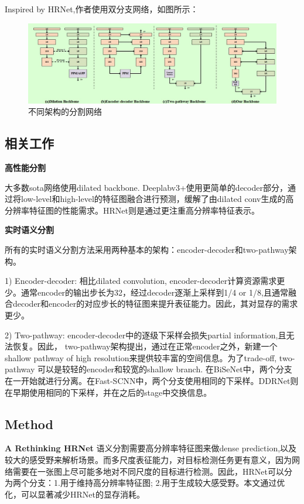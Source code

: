\documentclass{article}
\begin{document}
Inspired by HRNet,作者使用双分支网络，如图所示：
\begin{figure}[htbp]
\centering
\includegraphics[scale=0.3]{image/DDR_arch.jpg}
\caption{不同架构的分割网络}
\label{Fig.ddr_arch}
\end{figure}
\subsection{相关工作}
\textbf{高性能分割}

大多数sota网络使用dilated backbone. Deeplabv3+使用更简单的decoder部分，通过将low-level和high-level的特征图融合进行预测，缓解了由dilated conv生成的高分辨率特征图的性能需求。HRNet则是通过更注重高分辨率特征表示。

\textbf{实时语义分割}

所有的实时语义分割方法采用两种基本的架构：encoder-decoder和two-pathway架构。

1) Encoder-decoder: 相比dilated convolution, encoder-decoder计算资源需求更少。通常encoder的输出步长为32，经过decoder逐渐上采样到1/4 or 1/8,且通常融合decoder和encoder的对应步长的特征图来提升表征能力。因此，其对显存的需求更少。

2) Two-pathway: encoder-decoder中的逐级下采样会损失partial information,且无法恢复。因此， two-pathway架构提出，通过在正常encoder之外，新建一个shallow pathway of high resolution来提供较丰富的空间信息。为了trade-off, two-pathway 可以是较轻的encoder和较宽的shallow branch. 在BiSeNet中，两个分支在一开始就进行分离。在Fast-SCNN中，两个分支使用相同的下采样。DDRNet则在早期使用相同的下采样，并在之后的stage中交换信息。

\subsection{Method}
\textbf{A Rethinking HRNet}
语义分割需要高分辨率特征图来做dense prediction,以及较大的感受野来解析场景。而多尺度表征能力，对目标检测任务更有意义，因为网络需要在一张图上尽可能多地对不同尺度的目标进行检测。因此，HRNet可以分为两个分支：1.用于维持高分辨率特征图; 2.用于生成较大感受野。本文通过优化，可以显著减少HRNet的显存消耗。
\end{document}
